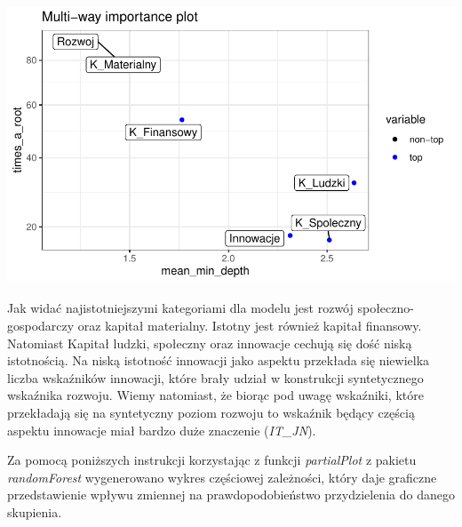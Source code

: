 \documentclass{amuthesis}
\begin{document}
\begin{Shaded}
\begin{Highlighting}[]
\SpecialCharTok{::}
     \NormalTok{)}
\end{Highlighting}
\end{Shaded}

\begin{center}\includegraphics[width=1\linewidth]{figures/unnamed-chunk-23-1} \end{center}

Jak widać najistotniejszymi kategoriami dla modelu jest rozwój społeczno-gospodarczy oraz kapitał materialny.
Istotny jest również kapitał finansowy.
Natomiast Kapitał ludzki, społeczny oraz innowacje cechują się dość niską istotnością.
Na niską istotność innowacji jako aspektu przekłada się niewielka liczba wskaźników innowacji, które brały udział w konstrukcji syntetycznego wskaźnika rozwoju.
Wiemy natomiast, że biorąc pod uwagę wskaźniki, które przekładają się na syntetyczny poziom rozwoju to wskaźnik będący częścią aspektu innowacje miał bardzo duże znaczenie (\emph{IT\_JN}).

Za pomocą poniższych instrukcji korzystając z funkcji \emph{partialPlot} z pakietu \emph{randomForest} wygenerowano wykres częściowej zależności, który daje graficzne przedstawienie wpływu zmiennej na prawdopodobieństwo przydzielenia do danego skupienia.

\begin{Shaded}
\begin{Highlighting}[]
\SpecialCharTok{::}
    \NormalTok{)}
\end{Highlighting}
\end{Shaded}
\end{document}
